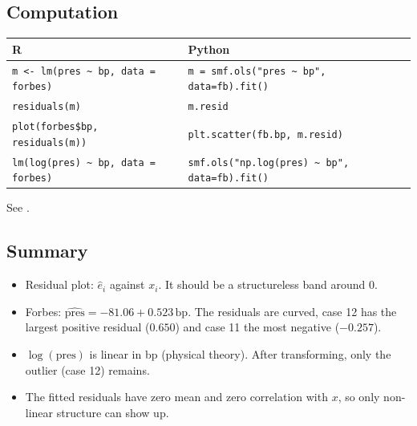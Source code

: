 \subsection{Computation}
\begin{center}\small
\begin{tabular}{@{}>{\raggedright\arraybackslash}p{7cm}>{\raggedright\arraybackslash}p{8.4cm}@{}}\hline
R & Python\\\hline
\texttt{m <- lm(pres \textasciitilde\ bp, data = forbes)} & \texttt{m = smf.ols("pres \textasciitilde\ bp", data=fb).fit()}\\
\texttt{residuals(m)} & \texttt{m.resid}\\
\texttt{plot(forbes\$bp, residuals(m))} & \texttt{plt.scatter(fb.bp, m.resid)}\\
\texttt{lm(log(pres) \textasciitilde\ bp, data = forbes)} & \texttt{smf.ols("np.log(pres) \textasciitilde\ bp", data=fb).fit()}\\\hline
\end{tabular}
\end{center}
See .

\subsection{Summary}
\begin{itemize}
  \item Residual plot: $\hat e_i$ against $x_i$. It should be a structureless band around $0$.
  \item Forbes: $\widehat{\text{pres}}=-81.06+0.523\,\text{bp}$. The residuals are curved, case 12 has the largest positive residual ($0.650$) and case 11 the most negative ($-0.257$).
  \item $\log(\text{pres})$ is linear in bp (physical theory). After transforming, only the outlier (case 12) remains.
  \item The fitted residuals have zero mean and zero correlation with $x$, so only non-linear structure can show up.
\end{itemize}

